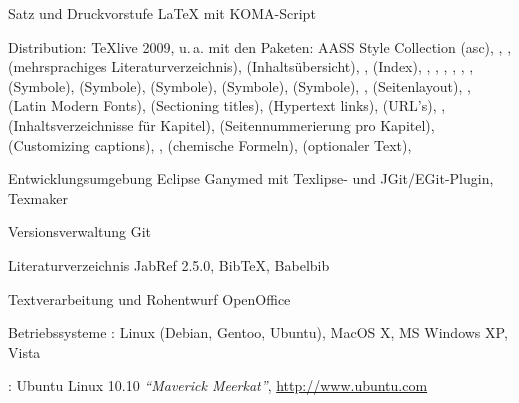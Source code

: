 \documentclass[
ngerman,
paper=a4,
asymmetric,
fontsize=9pt,
draft=false,
parskip=half,
bibtotocnumbered,
footnotes=multiple,
toc=flat,
]{scrbook}
\begin{document}
\begin{WidePar}
\begin{multicols}{3}

\begin{compactdesc}
  \item[Satz und Druckvorstufe] \LaTeX{} mit {\sffamily KOMA-Script}
  
  Distribution: \TeX live 2009, u.\,a. mit den Paketen: AASS
  Style Collection (asc),
  ,
  ,
   (mehrsprachiges Literaturverzeichnis),
   (Inhaltsübersicht),
  ,
   (Index),
  ,
  ,
  ,
  ,
  ,
  ,
   (Symbole),
   (Symbole),
   (Symbole),
   (Symbole),
   (Symbole),
  ,
   (Seitenlayout),
  ,
   (Latin Modern Fonts),
   (Sectioning titles),
   (Hypertext links),
   (URL's),
  ,
   (Inhaltsverzeichnisse für Kapitel),
   (Seitennummerierung pro Kapitel),
   (Customizing captions),
  ,
   (chemische Formeln),
   (optionaler Text),
  \item[Entwicklungsumgebung] Eclipse Ganymed mit Texlipse- und JGit/EGit-Plugin,
  Texmaker
  \item[Versionsverwaltung] Git
  \item[Literaturverzeichnis] JabRef 2.5.0, BibTeX, Babelbib
  \item[Textverarbeitung und Rohentwurf] OpenOffice
  \item[Betriebssysteme] : Linux (Debian, Gentoo, Ubuntu), MacOS X,
  MS Windows XP, Vista
  
  : Ubuntu Linux 10.10 \textit{"`Maverick
  Meerkat"'}, \url{http://www.ubuntu.com}
\end{compactdesc}


\end{multicols}
\end{WidePar}



\clearpage






\end{document}

